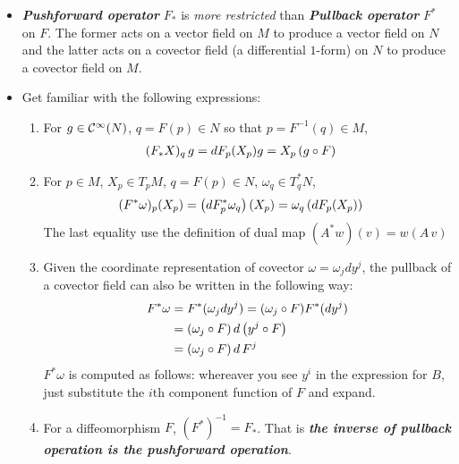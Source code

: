 \documentclass[11pt]{article}
\begin{document}
\begin{itemize}
\item \begin{remark} 
\emph{\textbf{Pushforward operator}} $F_{*}$ is \emph{more restricted} than \emph{\textbf{Pullback operator}} $F^{*}$ on $F$. The former acts on a vector field on $M$ to produce a vector field on $N$ and the latter acts on a covector field (a differential $1$-form) on $N$ to produce a covector field on $M$.
\end{remark}

\item \begin{remark} Get familiar with the following expressions:
\begin{enumerate}
\item For $g \in {\mathcal C}^{\infty}(N)$, $q = F(p) \in N$ so that $p= F^{-1}(q) \in M$, 
\begin{align*}
(F_{*}X)_{q}\,g &= dF_{p}(X_{p})g = X_{p}\left(g \circ F\right) 
\end{align*}

\item For $p\in M$, $X_{p} \in T_{p}M$, $q = F(p) \in N$, $\omega_{q} \in T_{q}^{*}N$, 
\begin{align*}
(F^{*}\omega)_{p}(X_{p}) &= \left(dF_{p}^{*}\omega_{q}\right)\left(X_{p}\right) = \omega_{q}\left(dF_{p}(X_{p})\right)
\end{align*} The last equality use the definition of dual map $(A^{*}w)(v) = w(A\,v)$

\item  Given the  coordinate representation of covector  $\omega = \omega_{j}dy^{j}$, the pullback of a covector field  can also be written in the
following way:
\begin{align}
F^{*}\omega &= F^{*}(\omega_{j}dy^{j}) = (\omega_{j} \circ F) F^{*}(dy^{j}) \nonumber\\
&= (\omega_{j} \circ F)\, d\left(y^{j} \circ F\right)  \label{eqn: pullback_covector_field_decompo_1}\\
&= (\omega_{j} \circ F) \,d\,F^{j}  \label{eqn: pullback_covector_field_decompo_2}
\end{align}
$F^{*}\omega$ is computed as follows: whereaver you see $y^i$ in the expression for $B$, just substitute the $i$th component function of $F$ and expand.

\item For a diffeomorphism $F$, $(F^{*})^{-1} = F_{*}$. That is \textbf{\emph{the inverse of pullback operation is the pushforward operation}}.
\end{enumerate}
\end{remark}
\end{itemize}
\end{document}
